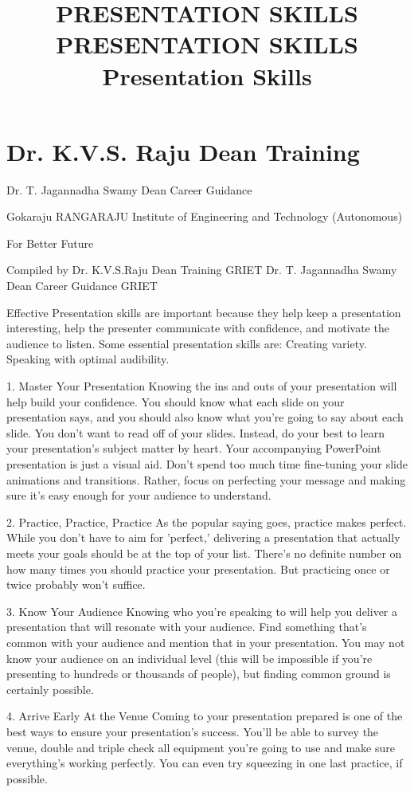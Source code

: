 \title{
PRESENTATION SKILLS
}
\section*{Dr. K.V.S. Raju Dean Training}
Dr. T. Jagannadha Swamy
Dean Career Guidance

Gokaraju RANGARAJU Institute of Engineering and Technology (Autonomous)

\title{
PRESENTATION SKILLS
}
For Better Future

Compiled by
Dr. K.V.S.Raju
Dean Training
GRIET
Dr. T. Jagannadha Swamy
Dean Career Guidance
GRIET

Effective Presentation skills are important because they help keep a presentation interesting, help the presenter communicate with confidence, and motivate the audience to listen. Some essential presentation skills are: Creating variety. Speaking with optimal audibility.
\title{
Presentation Skills
}

1. Master Your Presentation
Knowing the ins and outs of your presentation will help build your confidence. You should know what each slide on your presentation says, and you should also know what you're going to say about each slide. You don't want to read off of your slides. Instead, do your best to learn your presentation's subject matter by heart. Your accompanying PowerPoint presentation is just a visual aid. Don't spend too much time fine-tuning your slide animations and transitions. Rather, focus on perfecting your message and making sure it's easy enough for your audience to understand.

2. Practice, Practice, Practice
As the popular saying goes, practice makes perfect. While you don't have to aim for 'perfect,' delivering a presentation that actually meets your goals should be at the top of your list. There's no definite number on how many times you should practice your presentation. But practicing once or twice probably won't suffice.

3. Know Your Audience
Knowing who you're speaking to will help you deliver a presentation that will resonate with your audience. Find something that's common with your audience and mention that in your presentation. You may not know your audience on an individual level (this will be impossible if you're presenting to hundreds or thousands of people), but finding common ground is certainly possible.

4. Arrive Early At the Venue
Coming to your presentation prepared is one of the best ways to ensure your presentation's success. You'll be able to survey the venue, double and triple check all equipment you're going to use and make sure everything's working perfectly. You can even try squeezing in one last practice, if possible.

